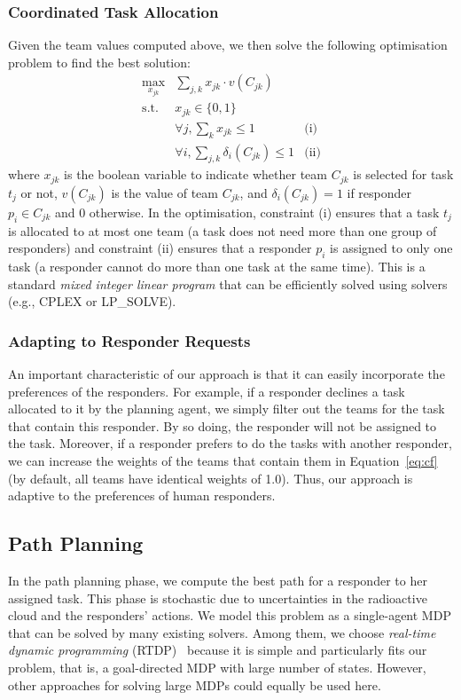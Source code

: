 \subsubsection{Coordinated Task Allocation}
Given the team values computed above, we then solve the following
optimisation problem to find the best solution:
\begin{equation}
  \begin{array}{lll}
    \max\limits_{x_{jk}} & \sum_{j, k} x_{jk} \cdot v(C_{jk}) & \\[2pt]
    \mbox{s.t.} & x_{jk} \in \{0, 1\} & \\[2pt]
    & \forall j, \sum_{k} x_{jk} \leq 1 & \mbox{(i)} \\[2pt]
    & \forall i, \sum_{j, k} \delta_i(C_{jk}) \leq 1 & \mbox{(ii)}
  \end{array}
  \label{eq:cf}
\end{equation}
where $x_{jk}$ is the boolean variable to indicate whether team
$C_{jk}$ is selected for task $t_j$ or not, $v(C_{jk})$ is the
value of team $C_{jk}$, and $\delta_i(C_{jk}) = 1$ if responder
$p_i\in C_{jk}$ and 0 otherwise. In the optimisation, constraint
(i) ensures that a task $t_j$ is allocated to at most one team (a
task does not need more than one group of responders) and
constraint (ii) ensures that a responder $p_i$ is assigned to only
one task (a responder cannot do more than one task at the same
time). This is a standard {\em mixed integer linear program} that
can be efficiently solved using solvers (e.g., CPLEX or LP\_SOLVE).

\subsubsection{Adapting to Responder Requests}\label{sec:adaptive}
An important characteristic of our approach is that it can easily
incorporate the preferences of the responders. For example, if a
responder declines a task allocated to it by the planning agent, we
simply filter out the teams for the task that contain this
responder. By so doing, the responder will not be assigned to the
task. Moreover, if a responder prefers to do the tasks with another
responder, we can increase the weights of the teams that contain
them in Equation~\ref{eq:cf} (by default, all teams have identical
weights of 1.0). Thus, our approach is adaptive to the
 preferences of human responders.\vspace{-2mm}

\subsection{Path Planning}
\label{sec:pathplanning}
In the path planning phase, we compute the best path for a
responder to her assigned task. This phase is stochastic due to uncertainties in the radioactive cloud and the responders'
actions. We model this problem as a single-agent MDP that can be
solved by many existing solvers. Among them, we choose {\em
real-time dynamic programming} (RTDP)~\cite{barto1995learning}
because it is simple and particularly fits our problem, that is, a
goal-directed MDP with large number of states. However, other
approaches for solving large MDPs  could equally be used here.

